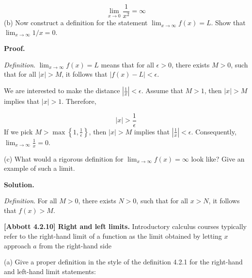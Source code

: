\documentclass[10pt]{article}
\begin{document}
\begin{equation*}
\lim _{x\rightarrow 0}\frac{1}{x^{2}} =\infty 
\end{equation*}
(b) Now construct a definition for the statement $\displaystyle \lim _{x\rightarrow \infty } f( x) =L$. Show that $\displaystyle \lim _{x\rightarrow \infty } 1/x=0$.



\textbf{Proof.}



\textit{Definition}. $\displaystyle \lim _{x\rightarrow \infty } f( x) =L$ means that for all $\displaystyle \epsilon  >0$, there exists $\displaystyle M >0$, such that for all $\displaystyle |x| >M$, it follows that $\displaystyle |f( x) -L|< \epsilon $.



We are interested to make the distance $\displaystyle \left| \frac{1}{x}\right| < \epsilon $. Assume that $\displaystyle M >1$, then $\displaystyle |x| >M$ implies that $\displaystyle |x| >1$. Therefore,


\begin{equation*}
|x| >\frac{1}{\epsilon }
\end{equation*}
 If we pick $\displaystyle M >\max\left\{1,\frac{1}{\epsilon }\right\}$, then $\displaystyle |x| >M$ implies that $\displaystyle \left| \frac{1}{x}\right| < \epsilon $. Consequently, $\displaystyle \lim _{x\rightarrow \infty }\frac{1}{x} =0$.



(c) What would a rigorous definition for $\displaystyle \lim _{x\rightarrow \infty } f( x) =\infty $ look like? Give an example of such a limit. 



\textbf{Solution.}



\textit{Definition}. For all $\displaystyle M >0$, there exists $\displaystyle N >0$, such that for all $\displaystyle x >N$, it follows that $\displaystyle f( x)  >M$.



\textbf{[Abbott 4.2.10] Right and left limits.} Introductory calculus courses typically refer to the right-hand limit of a function as the limit obtained by letting $\displaystyle x$ approach $\displaystyle a$ from the right-hand side 



(a) Give a proper definition in the style of the definition 4.2.1 for the right-hand and left-hand limit statements:
\end{document}
